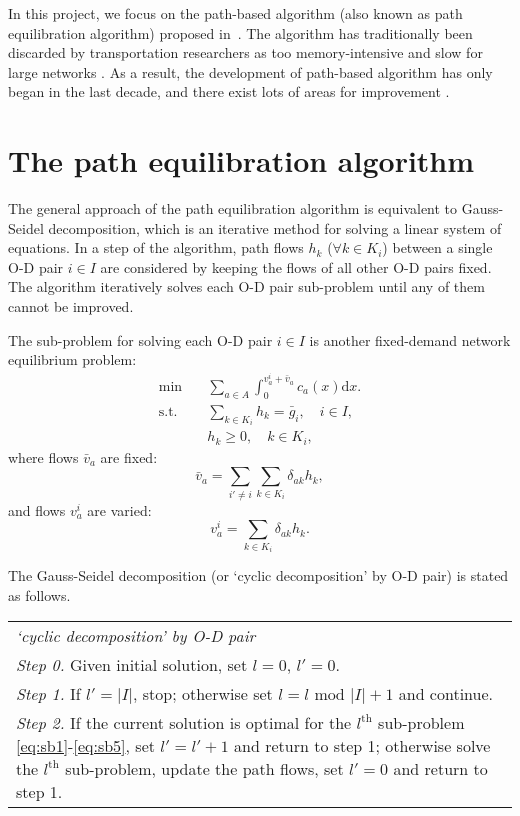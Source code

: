 In this project, we focus on the path-based algorithm (also known as path equilibration algorithm) proposed in~\citet{Dafermos1969}.
The algorithm has traditionally been discarded by transportation researchers as too memory-intensive and slow for large networks \citep{Jayakrishnan1994}.
As a result, the development of path-based algorithm has only began in the last decade, and there exist lots of areas for improvement \citep{Olga2013}.

\section{The path equilibration algorithm}
The general approach of the path equilibration algorithm is equivalent to
Gauss-Seidel decomposition, which is an iterative method for solving a linear system of equations.
In a step of the algorithm,
path flows $h_k$ ($\forall k \in K_i$) between a single O-D pair $i \in I$ are considered by keeping the flows of all other O-D pairs fixed.
The algorithm iteratively solves each O-D pair sub-problem until any of them cannot be improved.

The sub-problem for solving each O-D pair $i \in I$ is another fixed-demand network equilibrium problem:
\begin{align} \label{eq:sb1}
    \min & \quad \sum_{a \in A} \int_0^{v_a^i + \bar{v}_a} c_a(x) \mathrm{d} x.\\
    \text{s.t.} &\quad \sum_{k \in K_i} h_k = \bar{g}_i, \quad i \in I, \\
    & \quad h_k \geq 0, \quad k \in K_i,
\end{align}
where flows $\bar{v}_a$ are fixed:
\begin{equation}
    \bar{v}_a = \sum_{i' \neq i} \sum_{k \in K_i} \delta_{ak} h_k,
\end{equation}
and flows $v_a^i$ are varied:
\begin{equation} \label{eq:sb5}
    v_a^i = \sum_{k \in K_i} \delta_{ak} h_k.
\end{equation}

The Gauss-Seidel decomposition (or `cyclic decomposition' by O-D pair) is stated as follows.
\begin{table}[H]
    \begin{tabular}{ m{} }
        \hspace{-.5cm}\emph{`cyclic decomposition' by O-D pair} \citep{Florian} \\
        \emph{Step 0.} Given initial solution, set $l = 0$, $l' = 0$.\\
        \emph{Step 1.} If $l' = |I|$, stop; otherwise set $l = l \text{ mod } |I| + 1$ and continue.\\
        \emph{Step 2.} If the current solution is optimal for the $l^\text{th}$ sub-problem \eqref{eq:sb1}-\eqref{eq:sb5}, set $l' = l' + 1$ and return to step 1; otherwise solve the $l^\text{th}$ sub-problem, update the path flows, set $l' = 0$ and return to step 1.\\
    \end{tabular}
\end{table}

